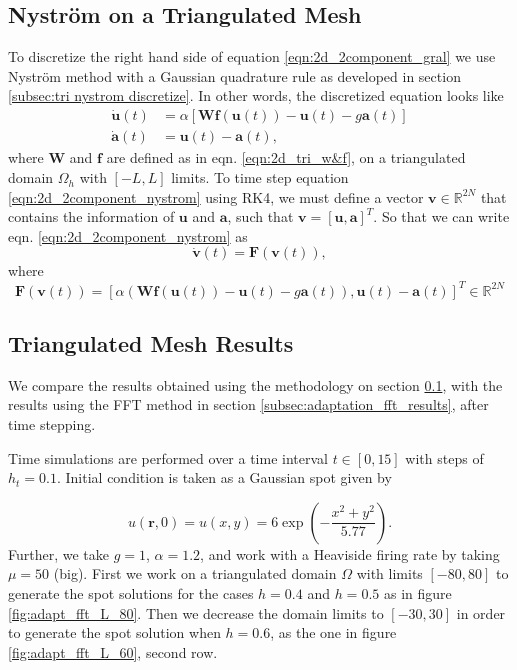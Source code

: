 \documentclass{uonmathreport}
\begin{document}
\subsection{Nystr\"om on a Triangulated Mesh}
\label{subsec:adaptation_triMesh_discretization}
To discretize the right hand side of equation \ref{eqn:2d_2component_gral} we use Nystr\"om method with a Gaussian quadrature rule as developed in section \ref{subsec:tri nystrom discretize}. In other words, the discretized equation looks like
\begin{subequations}\label{eqn:2d_2component_nystrom}
	\begin{align}
		\dot{\textbf{u}}(t) &= \alpha[\textbf{W}\textbf{f}(\textbf{u}(t)) -\textbf{u}(t)-g\textbf{a}(t)]\\
		\dot{\textbf{a}}(t) &= \textbf{u}(t) - \textbf{a}(t) 		 ,
	\end{align}
\end{subequations}
where $\textbf{W}$ and $\textbf{f}$ are defined as in eqn. \ref{eqn:2d_tri_w&f}, on a triangulated domain $\Omega_h$ with $[-L,L]$ limits. To time step equation \ref{eqn:2d_2component_nystrom} using RK4, we must define a vector $\textbf{v} \in \mathbb{R}^{2N}$ that contains the information of $\textbf{u}$ and $\textbf{a}$, such that $\textbf{v} = [\textbf{u}, \textbf{a}]^T$. So that we can write eqn. \ref{eqn:2d_2component_nystrom} as
\begin{equation}
	\dot{\textbf{v}}(t) = \textbf{F}(\textbf{v}(t)),
\end{equation}
where
\begin{equation}
\textbf{F}(\textbf{v}(t)) = [\alpha(\textbf{W}\textbf{f}(\textbf{u}(t)) -\textbf{u}(t)-g\textbf{a}(t)), \textbf{u}(t) - \textbf{a}(t)]^T \in \mathbb{R}^{2N}
\end{equation}

\subsection{Triangulated Mesh Results} \label{sebsec:adaptation_triMesh_results}
We compare the results obtained using the methodology on section \ref{subsec:adaptation_triMesh_discretization}, with the results using the FFT method in section \ref{subsec:adaptation_fft_results}, after time stepping.

Time simulations are performed over a time interval $t \in [0, 15]$ with steps of $h_t= 0.1$. Initial condition is taken as a Gaussian spot given by

\begin{equation}
u(\textbf{r}, 0) = u(x,y) = 6\exp{\left(-\frac{x^2+y^2}{5.77}\right)}.
\end{equation}
Further, we take $g=1$, $\alpha=1.2$, and work with a Heaviside firing rate by taking $\mu=50$ (big). First we work on a triangulated domain $\Omega$ with limits $[-80,80]$ to generate the spot solutions for the cases $h=0.4$ and $h=0.5$ as in figure \ref{fig:adapt_fft_L_80}. Then we decrease the domain limits to $[-30,30]$ in order to generate the spot solution when $h=0.6$, as the one in figure \ref{fig:adapt_fft_L_60}, second row. 
\end{document}
